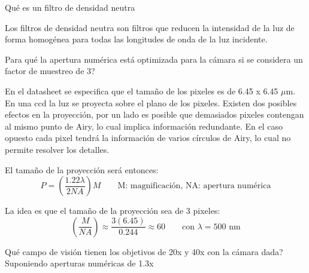 \documentclass[addpoints,12pt]{exam}
\begin{document}
	\begin{questions}
		{\question Qu\'e es un filtro de densidad neutra}
		
		Los filtros de densidad neutra son filtros que reducen la intensidad de la luz de forma homog\'enea para todas las longitudes de onda de la luz incidente.
		
		{\question Para qu\'e la apertura num\'erica est\'a optimizada para la c\'amara si se considera un factor de muestreo de 3?}
		
		En el datasheet se especifica que el tama\~no de los pixeles es de 6.45 x 6.45 $\mu$m. En una ccd la luz se proyecta sobre el plano de los pixeles. Existen dos posibles efectos en la proyecci\'on, por un lado es posible que demasiados pixeles contengan al mismo punto de Airy, lo cual implica informaci\'on redundante. En el caso opuesto cada pixel tendr\'a la informaci\'on de varios c\'irculos de Airy, lo cual no permite resolver los detalles.
		
		El tama\~no de la proyecci\'on ser\'a entonces:
		\begin{equation}
			P = \left(\dfrac{1.22\lambda}{2NA}\right)M \qquad \text{M: magnificaci\'on, NA: apertura num\'erica}
		\end{equation}
		
		La idea es que el tama\~no de la proyecci\'on sea de 3 pixeles:
		\begin{equation}
			\left(\dfrac{M}{NA}\right) \approx \dfrac{3(6.45)}{0.244} \approx 60 \qquad \text{con $\lambda = 500$ nm}
		\end{equation}
		
		{\question Qu\'e campo de visi\'on tienen los objetivos de 20x y 40x con la c\'amara dada?}
		Suponiendo aperturas num\'ericas de 1.3x 
	\end{questions}
\end{document}

